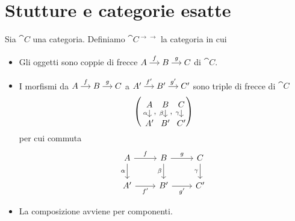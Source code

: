 \section{Stutture e categorie esatte}

\begin{recall}
  Sia \(\cat C\) una categoria. Definiamo \(\cat C^{\to\to}\) la
  categoria in cui
  \begin{itemize}
  \item Gli oggetti sono coppie di frecce
    \(\begin{tikzcd}[column sep=small, cramped] A \ar["{f}", r] & B
      \ar["{g}", r] & C \end{tikzcd}\) di \(\cat C\).
  \item I morfismi da
    \(\begin{tikzcd}[column sep=small, cramped] A \ar["{f}", r] & B
      \ar["{g}", r] & C \end{tikzcd}\) a
    \(\begin{tikzcd}[column sep=small, cramped] A' \ar["{f'}", r] & B'
      \ar["{g'}", r] & C' \end{tikzcd}\) sono triple di frecce di
    \(\cat C\)
    \[
      \left(
        \begin{tikzcd}[row sep=small, cramped] A \ar["{\alpha}", d, swap] \\
          A' \end{tikzcd},
        \begin{tikzcd}[row sep=small, cramped] B \ar["{\beta}", d, swap] \\
          B' \end{tikzcd},
        \begin{tikzcd}[row sep=small, cramped] C \ar["{\gamma}", d, swap] \\
          C' \end{tikzcd} \right)
    \]
    per cui commuta
    \[
      \begin{tikzcd}
        A \ar["{f}", r] \ar["{\alpha}", d, swap] & B \ar["{g}", r]
        \ar["{\beta}",
        d, swap] & C \ar["{\gamma}", d, swap] \\
        A' \ar["{f'}", r, swap] & B' \ar["{g'}", r, swap] & C'
      \end{tikzcd}
    \]
  \item La composizione avviene per componenti.
  \end{itemize}
\end{recall}

